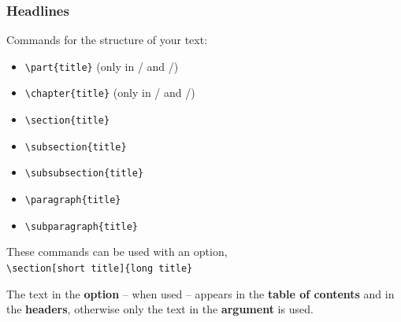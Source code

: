 \begin{frame}[fragile]
\frametitle{Headlines}

\noindent Commands for the structure of your text:

\begin{itemize}
	\item \lstinline|\part{title}|  \hfill (only in  / and /)
	
	\item \lstinline|\chapter{title}| \hfill (only in  / and /)
		
	\item \lstinline|\section{title}|
	
	\item \lstinline|\subsection{title}| 
	
	\item \lstinline|\subsubsection{title}| 
	
	\item \lstinline|\paragraph{title}|
	
	\item \lstinline|\subparagraph{title}|
\end{itemize}

\pause 

\bigskip

\noindent These commands can be used with an option, \fe\\

\lstinline|\section[short title]{long title}| 

\bigskip

The text in the \textbf{option} -- when used -- appears in the \textbf{table of contents} and in the \textbf{headers}, otherwise only the text in the \textbf{argument} is used.


\end{frame}


